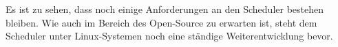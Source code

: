 \documentclass[ngerman]{seminarvorlage}
\begin{document}
Es ist zu sehen, dass noch einige Anforderungen an den Scheduler bestehen bleiben.
Wie auch im Bereich des Open-Source zu erwarten ist, steht dem Scheduler unter Linux-Systemen noch eine ständige Weiterentwicklung bevor.  


\pagebreak

%
%


\end{document}
